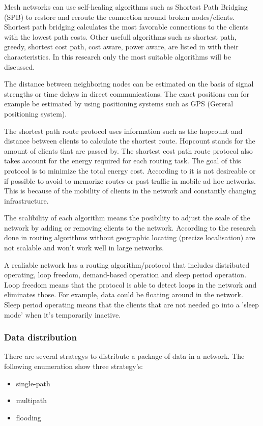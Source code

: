 \documentclass[10pt,a4paper]{article}
\begin{document}
Mesh networks can use self-healing algorithms such as Shortest Path Bridging (SPB) to restore and reroute the connection around broken nodes/clients. Shortest path bridging calculates the most favorable connections to the clients with the lowest path costs. \cite{SPB} Other usefull algorithms such as shortest path, greedy, shortest cost path, cost aware, power aware, are listed in \cite{position-based} with their characteristics. In this research only the most suitable algorithms will be discussed. 

The distance between neighboring nodes can be estimated on the basis of signal strengths or time delays in direct communications. The exact positions can for example be estimated by using positioning systems such as GPS (Gereral positioning system). \cite{locationsystemsforubiquitouscomputing} 




The shortest path route protocol uses information such as the hopcount and distance between clients to calculate the shortest route. Hopcount stands for the amount of clients that are passed by. The shortest cost path route protocol also takes account for the energy required for each routing task. The goal of this protocol is to minimize the total energy cost. According to \cite{position-based} it is not desireable or if possible to avoid to memorize routes or past traffic in mobile ad hoc networks. This is because of the mobility of clients in the network and constantly changing infrastructure.


The scalibility of each algorithm means the posibility to adjust the scale of the network by adding or removing clients to the network. According to the research done in \cite{geographicalrouting}\cite{scalablelocation} routing algorithms without geographic locating (precize localisation) are not scalable and won't work well in large networks. 

A realiable network has a routing algorithm/protocol that includes distributed operating, loop freedom, demand-based operation and sleep period operation. Loop freedom means that the protocol is able to detect loops in the network and eliminates those. For example, data could be floating around in the network. Sleep period operating means that the clients that are not needed go into a 'sleep mode' when it's temporarily inactive.\cite{position-based}


\subsubsection{Data distribution}
There are several strategys to distribute a package of data in a network. The following enumeration show three strategy's:
\begin{itemize}
\setlength\itemsep{0em}
    \item single-path
    \item multipath
    \item flooding
\end{itemize}
\end{document}
